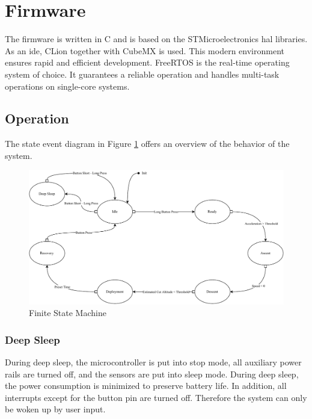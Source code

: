 \newpage

\section{Firmware}
The firmware is written in C and is based on the STMicroelectronics \acrshort{hal} libraries. As an \acrshort{ide}, CLion together with CubeMX is used. This modern environment ensures rapid and efficient development.\newline
FreeRTOS is the real-time operating system of choice. It guarantees a reliable operation and handles multi-task operations on single-core systems.

\subsection{Operation}\label{operation}

The state event diagram in Figure \ref{fig:fsm} offers an overview of the behavior of the system.

\begin{figure}[h!]
	\centering
	\includegraphics[width=\textwidth]{images/fsm}
	\caption{Finite State Machine}
	\label{fig:fsm}
\end{figure}

\subsubsection{Deep Sleep}
During deep sleep, the microcontroller is put into stop mode, all auxiliary power rails are turned off, and the sensors are put into sleep mode. During deep sleep, the power consumption is minimized to preserve battery life. In addition, all interrupts except for the button pin are turned off. Therefore the system can only be woken up by user input.  

